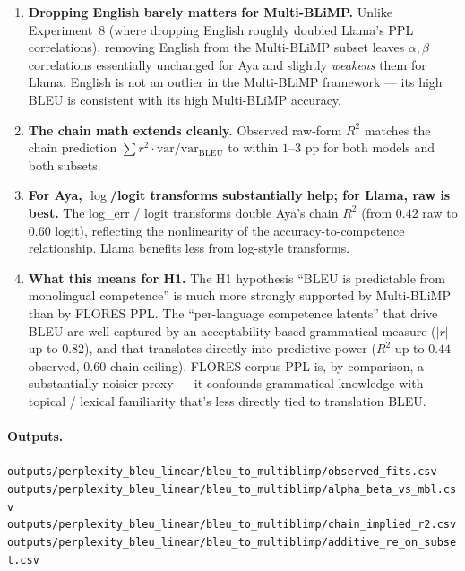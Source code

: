 \documentclass[11pt]{article}
\newcommand{\code}[1]{\texttt{\small #1}}
\begin{document}
\begin{center}
\begin{enumerate}
  \item \textbf{Dropping English barely matters for Multi-BLiMP.}
    Unlike Experiment~8 (where dropping English roughly doubled Llama's
    PPL correlations), removing English from the Multi-BLiMP subset
    leaves $\alpha, \beta$ correlations essentially unchanged for Aya
    and slightly \emph{weakens} them for Llama. English is not an
    outlier in the Multi-BLiMP framework --- its high BLEU is
    consistent with its high Multi-BLiMP accuracy.

  \item \textbf{The chain math extends cleanly.} Observed raw-form $R^2$
    matches the chain prediction $\sum r^2 \cdot \mathrm{var} /
    \mathrm{var}_{\text{BLEU}}$ to within $1$--$3$ pp for both models
    and both subsets.

  \item \textbf{For Aya, $\log$/logit transforms substantially help; for
    Llama, raw is best.} The log\_err / logit transforms double Aya's
    chain $R^2$ (from $0.42$ raw to $0.60$ logit), reflecting the
    nonlinearity of the accuracy-to-competence relationship. Llama
    benefits less from log-style transforms.

  \item \textbf{What this means for H1.} The H1 hypothesis ``BLEU is
    predictable from monolingual competence'' is much more strongly
    supported by Multi-BLiMP than by FLORES PPL. The ``per-language
    competence latents'' that drive BLEU are well-captured by an
    acceptability-based grammatical measure ($|r|$ up to $0.82$), and
    that translates directly into predictive power ($R^2$ up to $0.44$
    observed, $0.60$ chain-ceiling). FLORES corpus PPL is, by
    comparison, a substantially noisier proxy --- it confounds
    grammatical knowledge with topical / lexical familiarity that's
    less directly tied to translation BLEU.
\end{enumerate}

\paragraph{Outputs.}

\code{outputs/perplexity\_bleu\_linear/bleu\_to\_multiblimp/observed\_fits.csv} \\
\code{outputs/perplexity\_bleu\_linear/bleu\_to\_multiblimp/alpha\_beta\_vs\_mbl.csv} \\
\code{outputs/perplexity\_bleu\_linear/bleu\_to\_multiblimp/chain\_implied\_r2.csv} \\
\code{outputs/perplexity\_bleu\_linear/bleu\_to\_multiblimp/additive\_re\_on\_subset.csv}


\end{center}
\end{document}
